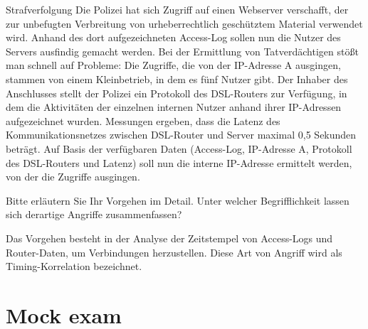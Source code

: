 \documentclass{article}
\begin{document}
\begin{exercise}{Strafverfolgung}
  Die Polizei hat sich Zugriff auf einen Webserver verschafft, der zur unbefugten Verbreitung von urheberrechtlich geschütztem Material verwendet wird. Anhand des dort aufgezeichneten Access-Log sollen nun die Nutzer des Servers ausfindig gemacht werden. Bei der Ermittlung von Tatverdächtigen stößt man schnell auf Probleme: Die Zugriffe, die von der IP-Adresse A ausgingen, stammen von einem Kleinbetrieb, in dem es fünf Nutzer gibt. Der Inhaber des Anschlusses stellt der Polizei ein Protokoll des DSL-Routers zur Verfügung, in dem die Aktivitäten der einzelnen internen Nutzer anhand ihrer IP-Adressen aufgezeichnet wurden. Messungen ergeben, dass die Latenz des Kommunikationsnetzes zwischen DSL-Router und Server maximal 0,5 Sekunden beträgt. Auf Basis der verfügbaren Daten (Access-Log, IP-Adresse A, Protokoll des DSL-Routers und Latenz) soll nun die interne IP-Adresse ermittelt werden, von der die Zugriffe ausgingen.

  Bitte erläutern Sie Ihr Vorgehen im Detail. Unter welcher Begrifflichkeit lassen sich derartige Angriffe zusammenfassen?

  \begin{solution}
    Das Vorgehen besteht in der Analyse der Zeitstempel von Access-Logs und Router-Daten, um Verbindungen herzustellen. Diese Art von Angriff wird als Timing-Korrelation bezeichnet.
  \end{solution}
\end{exercise}



\setcounter{section}{2023}
\section{Mock exam}

%



\setcounter{section}{2019}
\end{document}
